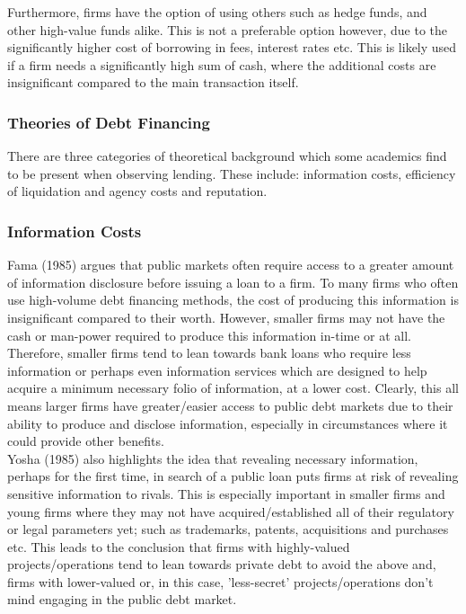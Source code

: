 \documentclass[11pt, english]{article}
\begin{document}
	Furthermore, firms have the option of using others such as hedge funds, and other high-value funds alike. This is not a preferable option however, due to the significantly higher cost of borrowing in fees, interest rates etc. This is likely used if a firm needs a significantly high sum of cash, where the additional costs are insignificant compared to the main transaction itself.

		\subsubsection*{Theories of Debt Financing}

	There are three categories of theoretical background which some academics find to be present when observing lending. These include: information costs, efficiency of liquidation and agency costs and reputation.

		\subsubsection*{Information Costs}

	Fama (1985) argues that public markets often require access to a greater amount of information disclosure before issuing a loan to a firm. To many firms who often use high-volume debt financing methods, the cost of producing this information is insignificant compared to their worth. However, smaller firms may not have the cash or man-power required to produce this information in-time or at all. Therefore, smaller firms tend to lean towards bank loans who require less information or perhaps even information services which are designed to help acquire a minimum necessary folio of information, at a lower cost. Clearly, this all means larger firms have greater/easier access to public debt markets due to their ability to produce and disclose information, especially in circumstances where it could provide other benefits.\\

	Yosha (1985) also highlights the idea that revealing necessary information, perhaps for the first time, in search of a public loan puts firms at risk of revealing sensitive information to rivals. This is especially important in smaller firms and young firms where they may not have acquired/established all of their regulatory or legal parameters yet; such as trademarks, patents, acquisitions and purchases etc. This leads to the conclusion that firms with highly-valued projects/operations tend to lean towards private debt to avoid the above and, firms with lower-valued or, in this case, 'less-secret' projects/operations don't mind engaging in the public debt market.
\end{document}
